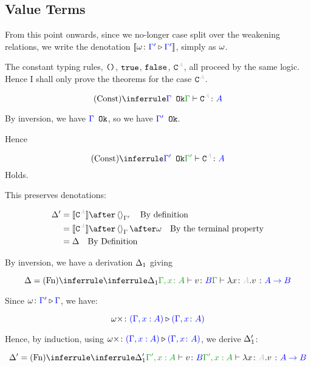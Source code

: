 \documentclass{report}
\begin{document}
\subsection{Value Terms}
From this point onwards, since we no-longer case split over the weakening relations, we write the denotation ${\bf [\![}\omega \colon {\color{blue}\Gamma'} \triangleright {\color {blue} \Gamma'}{\bf ]\!]}$, simply as $\omega$.


The constant typing rules, $\texttt{()}$, $\texttt{true}$, $\texttt{false}$, $\const{A}$, all proceed by the same logic. Hence I shall only prove the theorems for the case $\const{A}$.

\begin{equation}
    \truleconst
\end{equation}

By inversion, we have ${\color{blue} \Gamma} \texttt{ Ok}$, so we have ${\color{blue} \Gamma'} \texttt{ Ok}$.

Hence

\begin{equation}
    \ntreeruleI{Const}{\ok{\G'}}{\typerelation{\G'}{\const{A}}{A}}
\end{equation}
Holds.

This preserves denotations:


\begin{align*}
    \D' & = \deno{\const{A}} \after \term{\G'}\qt{By definition}\\
    & = \deno{\const{A}} \after \term{\G}\after \w \qt{By the terminal property}\\
    & = \D\qt{By Definition}\\
\end{align*}


By inversion, we have a derivation $\Delta_1$ giving

\begin{equation}
    \D = \ntreeruleI{Fn}{
        \treeruleI{\D_1}{\typerelation{\gax}{v}{B}}
    }{\gtyperelation{\lam{x}{A}{v}}{\ab}}
\end{equation}

Since $\omega \colon {\color{blue}\Gamma'} \triangleright {\color {blue} \Gamma}$, we have:

\begin{equation}
    \omega\times \colon {\color{blue}(\Gamma,x:  A)} \triangleright {\color {blue} (\Gamma, x\colon A)}
\end{equation}

Hence, by induction, using $\omega\times \colon {\color{blue}(\Gamma,x:  A)} \triangleright {\color {blue} (\Gamma, x\colon A)}$, we derive $\Delta_1'$:

\begin{equation}
    \D' = \ntreeruleI{Fn}{
        \treeruleI{\D_1'}{\typerelation{\G',x: A}{v}{B}}
    }{\typerelation{\G',x: A}{\lam{x}{A}{v}}{\ab}}
\end{equation}
\end{document}
